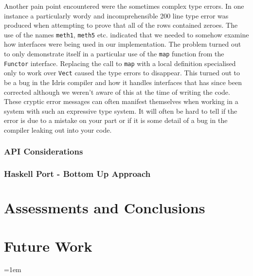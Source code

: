\documentclass[a4paper, notitlepage]{report}
\begin{document}
Another pain point encountered were the sometimes complex type errors. In one
instance a particularly wordy and incomprehensible 200 line type error was
produced when attempting to prove that all of the rows contained zeroes. The use
of the names \texttt{meth1}, \texttt{meth5} etc. indicated that we needed to somehow examine how
interfaces were being used in our implementation. The problem turned out to only
demonstrate itself in a particular use of the \texttt{map} function from the \texttt{Functor}
interface. Replacing the call to \texttt{map} with a local definition specialised only to
work over \texttt{Vect} caused the type errors to disappear. This turned out to be a bug
in the Idris compiler and how it handles interfaces that has since been
corrected although we weren't aware of this at the time of writing the code.
These cryptic error messages can often manifest themselves when working in a
system with such an expressive type system. It will often be hard to tell if the
error is due to a mistake on your part or if it is some detail of a bug in the
compiler leaking out into your code.

\subsection{API Considerations}
\label{sec:org517a19e}


\subsection{Haskell Port - Bottom Up Approach}
\label{sec:orgea35756}
\chapter{Assessments and Conclusions}
\label{sec:orgb467ee4}
\chapter{Future Work}
\label{sec:org8858ff5}

\emergencystretch=1em
\printbibliography[heading=bibintoc, title=References]
\appendix
\end{document}
